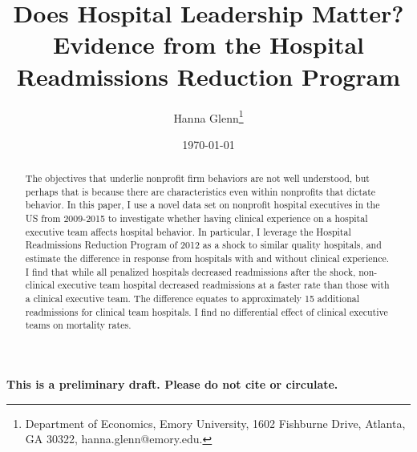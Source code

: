 \documentclass[12pt]{article}
\begin{document}
	
	
	
	
	\linespread{1.2}\title{\vspace{-0.5in} Does Hospital Leadership Matter?\\ \large Evidence from the Hospital Readmissions Reduction Program} 
	
	\date{\today}
	
	\author{\vspace{10mm}Hanna Glenn\footnote{Department of Economics, Emory University, 1602 Fishburne Drive, Atlanta, GA 30322, hanna.glenn@emory.edu.} }
	
	\maketitle
	
	\vspace{-0.2in}
	
	\singlespacing\maketitle

    \begin{center}
    \large
    \textbf{This is a preliminary draft. Please do not cite or circulate.}
	\end{center}

 \vspace{3mm}
	
    \begin{abstract}
		{\small
		The objectives that underlie nonprofit firm behaviors are not well understood, but perhaps that is because there are characteristics even within nonprofits that dictate behavior. In this paper, I use a novel data set on nonprofit hospital executives in the US from 2009-2015 to investigate whether having clinical experience on a hospital executive team affects hospital behavior. In particular, I leverage the Hospital Readmissions Reduction Program of 2012 as a shock to similar quality hospitals, and estimate the difference in response from hospitals with and without clinical experience. I find that while all penalized hospitals decreased readmissions after the shock, non-clinical executive team hospital decreased readmissions at a faster rate than those with a clinical executive team. The difference equates to approximately 15 additional readmissions for clinical team hospitals. I find no differential effect of clinical executive teams on mortality rates.
			
		} 
	\end{abstract}
	
\end{document}
